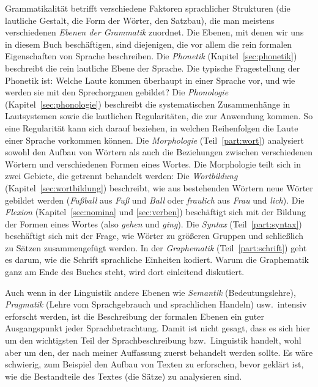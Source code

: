 \label{sec:grebenen}


Grammatikalität betrifft verschiedene Faktoren sprachlicher Strukturen (\zB die lautliche Gestalt, die Form der Wörter, den Satzbau), die man meistens verschiedenen \textit{Ebenen der Grammatik} zuordnet.
Die Ebenen, mit denen wir uns in diesem Buch beschäftigen, sind diejenigen, die vor allem die rein formalen Eigenschaften von Sprache beschreiben.
Die \textit{Phonetik} (Kapitel~\ref{sec:phonetik}) beschreibt die rein lautliche Ebene der Sprache.
Die typische Fragestellung der Phonetik ist:
Welche Laute kommen überhaupt in einer Sprache vor, und wie werden sie mit den Sprechorganen gebildet?
Die \textit{Phonologie} (Kapitel~\ref{sec:phonologie}) beschreibt die systematischen Zusammenhänge in Lautsystemen sowie die lautlichen Regularitäten, die zur Anwendung kommen.
So eine Regularität kann sich \zB darauf beziehen, in welchen Reihenfolgen die Laute einer Sprache vorkommen können.
Die \textit{Morphologie} (Teil~\ref{part:wort}) analysiert sowohl den Aufbau von Wörtern als auch die Beziehungen zwischen verschiedenen Wörtern und verschiedenen Formen eines Wortes.
Die Morphologie teilt sich in zwei Gebiete, die getrennt behandelt werden:
Die \textit{Wortbildung} (Kapitel~\ref{sec:wortbildung}) beschreibt, wie aus bestehenden Wörtern neue Wörter gebildet werden (\zB \textit{Fußball} aus \textit{Fuß} und \textit{Ball} oder \textit{fraulich} aus \textit{Frau} und \textit{lich}).
Die \textit{Flexion} (Kapitel~\ref{sec:nomina} und \ref{sec:verben}) beschäftigt sich mit der Bildung der Formen eines Wortes (also \zB \textit{gehen} und \textit{ging}). 
Die \textit{Syntax} (Teil~\ref{part:syntax}) beschäftigt sich mit der Frage, wie Wörter zu größeren Gruppen und schließlich zu Sätzen zusammengefügt werden.
In der \textit{Graphematik} (Teil~\ref{part:schrift}) geht es darum, wie die Schrift sprachliche Einheiten kodiert.
Warum die Graphematik ganz am Ende des Buches steht, wird dort einleitend diskutiert.

Auch wenn in der Linguistik andere Ebenen wie \textit{Semantik} (Bedeutungslehre), \textit{Pragmatik} (Lehre vom Sprachgebrauch und sprachlichen Handeln) usw.\ intensiv erforscht werden, ist die Beschreibung der formalen Ebenen ein guter Ausgangspunkt jeder Sprachbetrachtung.
Damit ist nicht gesagt, dass es sich hier um den wichtigsten Teil der Sprachbeschreibung bzw.\ Linguistik handelt, wohl aber um den, der nach meiner Auffassung zuerst behandelt werden sollte.
Es wäre schwierig, zum Beispiel den Aufbau von Texten zu erforschen, bevor geklärt ist, wie die Bestandteile des Textes (die Sätze) zu analysieren sind.

